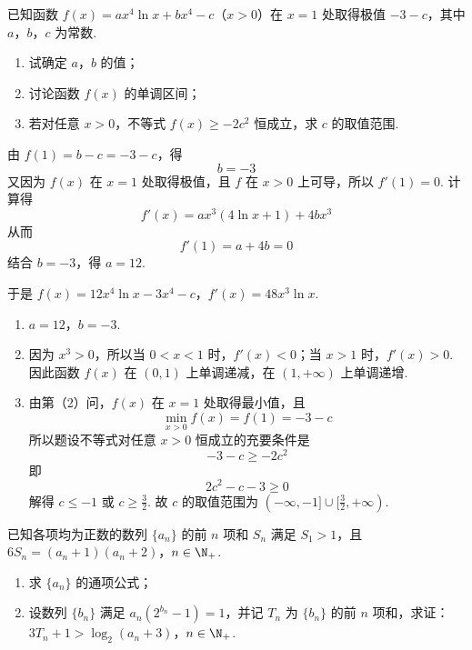 \begin{problem}
已知函数 \( f(x) = ax^{4}\ln x + bx^{4} - c \)（\(x > 0\)）在 \( x = 1 \) 处取得极值 \(-3 - c\)，其中 \(a\)，\(b\)，\(c\) 为常数.

\begin{enumerate}
\item 试确定 \(a\)，\(b\) 的值；
\item 讨论函数 \( f(x) \) 的单调区间；
\item 若对任意 \(x > 0\)，不等式 \(f(x) \geqslant -2c^{2}\) 恒成立，求 \(c\) 的取值范围.
\end{enumerate}
\end{problem}

\begin{solution}
由 \(f(1)=b-c=-3-c\)，得
\[
b=-3
\]
又因为 \(f(x)\) 在 \(x=1\) 处取得极值，且 \(f\) 在 \(x>0\) 上可导，所以 \(f'(1)=0\). 计算得
\[
f'(x)=ax^{3}(4\ln x+1)+4bx^{3}
\]
从而
\[
f'(1)=a+4b=0
\]
结合 \(b=-3\)，得 \(a=12\).

于是
\(f(x)=12x^{4}\ln x-3x^{4}-c\)，\(f'(x)=48x^{3}\ln x\).
\begin{enumerate}
\item \(a=12\)，\(b=-3\).
\item 因为 \(x^{3}>0\)，所以当 \(0<x<1\) 时，\(f'(x)<0\)；当 \(x>1\) 时，\(f'(x)>0\). 因此函数 \(f(x)\) 在 \((0,1)\) 上单调递减，在 \((1,+\infty)\) 上单调递增.
\item 由第（2）问，\(f(x)\) 在 \(x=1\) 处取得最小值，且
\[
\min_{x>0}f(x)=f(1)=-3-c
\]
所以题设不等式对任意 \(x>0\) 恒成立的充要条件是
\[
-3-c\geqslant-2c^{2}
\]
即
\[
2c^{2}-c-3\geqslant0
\]
    解得 \(c\leqslant-1\) 或 \(c\geqslant\frac{3}{2}\).
故 \(c\) 的取值范围为 \((-\infty,-1]\cup[\frac{3}{2},+\infty)\).
\end{enumerate}
\end{solution}

\begin{problem}
已知各项均为正数的数列 \(\{a_{n}\}\) 的前 \(n\) 项和 \(S_{n}\) 满足 \(S_{1} > 1\)，且 \(6S_{n} = (a_{n} + 1)(a_{n} + 2)\)，\(n \in \N_{+}\).

\begin{enumerate}
\item 求 \( \{a_{n}\} \) 的通项公式；
\item 设数列 \( \{b_{n}\} \) 满足 \( a_{n}(2^{b_{n}}-1)=1 \)，并记 \( T_{n} \) 为 \( \{b_{n}\} \) 的前 \(n\) 项和，求证： \(3T_{n}+1>\log_{2}(a_{n}+3)\)，\(n\in\N_{+}\).
\end{enumerate}
\end{problem}

